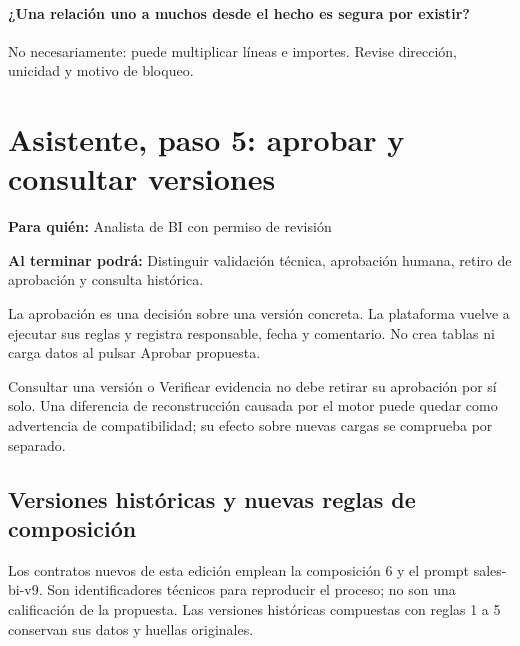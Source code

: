 \paragraph{¿Una relación uno a muchos desde el hecho es segura por existir?} No necesariamente: puede multiplicar líneas e importes. Revise dirección, unicidad y motivo de bloqueo.


\section{Asistente, paso 5: aprobar y consultar versiones}
\label{unidad:BI07}
\textbf{Para quién:} Analista de BI con permiso de revisión\par
\textbf{Al terminar podrá:} Distinguir validación técnica, aprobación humana, retiro de aprobación y consulta histórica.

La aprobación es una decisión sobre una versión concreta. La plataforma vuelve a ejecutar sus reglas y registra responsable, fecha y comentario. No crea tablas ni carga datos al pulsar Aprobar propuesta.

Consultar una versión o Verificar evidencia no debe retirar su aprobación por sí solo. Una diferencia de reconstrucción causada por el motor puede quedar como advertencia de compatibilidad; su efecto sobre nuevas cargas se comprueba por separado.

\subsection{Versiones históricas y nuevas reglas de composición}
Los contratos nuevos de esta edición emplean la composición 6 y el prompt sales-bi-v9. Son identificadores técnicos para reproducir el proceso; no son una calificación de la propuesta. Las versiones históricas compuestas con reglas 1 a 5 conservan sus datos y huellas originales.

